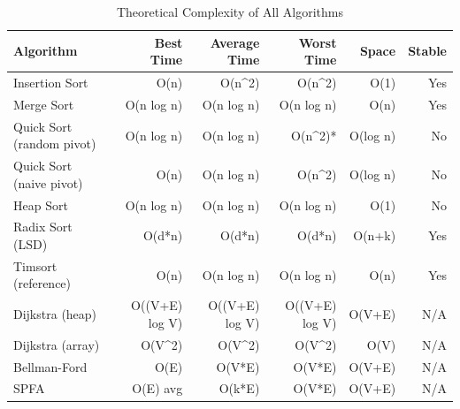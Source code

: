 \begin{table}[htbp]
\centering
\caption{Theoretical Complexity of All Algorithms}
\label{tab:complexity}
\begin{tabular}{lrrrrr}
\hline
Algorithm & Best Time & Average Time & Worst Time & Space & Stable \\
\hline
Insertion Sort & O(n) & O(n^2) & O(n^2) & O(1) & Yes \\
Merge Sort & O(n log n) & O(n log n) & O(n log n) & O(n) & Yes \\
Quick Sort (random pivot) & O(n log n) & O(n log n) & O(n^2)* & O(log n) & No \\
Quick Sort (naive pivot) & O(n) & O(n log n) & O(n^2) & O(log n) & No \\
Heap Sort & O(n log n) & O(n log n) & O(n log n) & O(1) & No \\
Radix Sort (LSD) & O(d*n) & O(d*n) & O(d*n) & O(n+k) & Yes \\
Timsort (reference) & O(n) & O(n log n) & O(n log n) & O(n) & Yes \\
Dijkstra (heap) & O((V+E) log V) & O((V+E) log V) & O((V+E) log V) & O(V+E) & N/A \\
Dijkstra (array) & O(V^2) & O(V^2) & O(V^2) & O(V) & N/A \\
Bellman-Ford & O(E) & O(V*E) & O(V*E) & O(V+E) & N/A \\
SPFA & O(E) avg & O(k*E) & O(V*E) & O(V+E) & N/A \\
\hline
\end{tabular}
\end{table}
